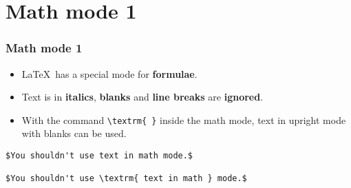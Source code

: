 \section{Math mode 1}

\begin{frame}[fragile]
\frametitle{Math mode 1}

\begin{itemize}
	\item \LaTeX\ has a special mode for \textbf{formulae}. 
	
	\item Text is in \textbf{italics}, \textbf{blanks} and \textbf{line breaks} are \textbf{ignored}.  	
	
	\item With the command \lstinline|\textrm{ }| inside the math mode, text in upright mode with blanks can be used.
	
\end{itemize}

\pause 
{\small 
\begin{lstlisting}
$You shouldn't use text in math mode.$ 

$You shouldn't use \textrm{ text in math } mode.$
\end{lstlisting}
}


\end{frame}



